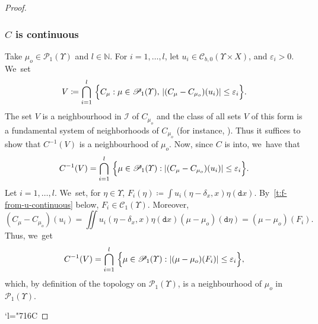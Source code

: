 \documentclass[10pt]{amsart}
\newcommand{\Changelback}{\mathcode`l="716C}
\theoremstyle{definition}
\theoremstyle{remark}
\DeclarePairedDelimiter{\set}{\lbrace}{\rbrace}
\DeclarePairedDelimiter{\abs}{\lvert}{\rvert}
\begin{document}
\begin{proof}
\subsubsection*{$C$ is continuous}
Take $\mu_{o} \in \mathscr{P}_{1}(\varUpsilon)$ and $l \in \mathbb{N}$.
For $i=1,\dots,l$, let $u_{i} \in \mathscr{C}_{b,0}(\varUpsilon \times X)$, and $\varepsilon_{i} > 0$. We~set
\begin{equation*}
V \coloneq \bigcap_{i=1}^{l} \ \set[\Big]{ C_{\mu} : \mu \in \mathscr{P}_{1}(\varUpsilon),\, \abs{(C_{\mu} - C_{\mu_{o}})(u_{i})} \leq \varepsilon_{i}}.
\end{equation*}
The set $V$ is a neighbourhood in $\mathscr{I}$ of $C_{\mu_{o}}$ and the class of all sets $V$ of this form is a fundamental system of neighborhoods of $C_{\mu_{o}}$ (for instance, \cite[II, pp.\,2-4]{BourbakiIntegration}).
Thus it suffices to show that $C^{-1}(V)$ is a neighbourhood of $\mu_{o}$.
Now, since $C$ is into, we~have that
\begin{equation*}
C^{-1}(V) = \bigcap_{i=1}^{l} \ \set[\Big]{ \mu \in \mathscr{P}_{1}(\varUpsilon) : \abs{(C_{\mu} - C_{\mu_{o}})(u_{i})} \leq \varepsilon_{i} }.
\end{equation*}
Let $i = 1,\dots, l$. We~set, for $\eta \in \varUpsilon$, $F_{i}(\eta) \coloneq \int u_{i}(\eta - \delta_{x}, x) \eta(\mathtt{d} x)$.
By~\cref{t:f-from-u-continuous} below, $F_{i} \in \mathscr{C}_{1}(\varUpsilon)$.
Moreover,
\begin{equation*}
(C_{\mu} - C_{\mu_{o}})(u_{i}) = \iint u_{i}(\eta-\delta_{x}, x) \eta(\mathtt{d} x)(\mu - \mu_{o})(\mathtt{d} \eta) = (\mu - \mu_{o})(F_{i}).
\end{equation*}
Thus, we~get
\begin{equation*}
C^{-1}(V) = \bigcap_{i=1}^{l} \ \set[\Big]{ \mu \in \mathscr{P}_{1}(\varUpsilon) : \abs{(\mu - \mu_{o})(F_{i})} \leq \varepsilon_{i}},
\end{equation*}
which, by definition of the topology on $\mathscr{P}_{1}(\varUpsilon)$, is a neighbourhood of $\mu_{o}$ in $\mathscr{P}_{1}(\varUpsilon)$.

\Changelback

\end{proof}
\end{document}
